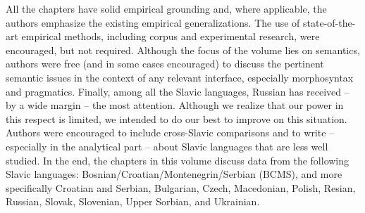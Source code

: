 \documentclass[output=paper,colorlinks,citecolor=brown]{langscibook}
\begin{document}
All the chapters have solid empirical grounding and, where applicable, the authors emphasize the existing empirical generalizations. The use of state-of-the-art empirical methods, including corpus and experimental research, were encouraged, but not required. Although the focus of the volume lies on semantics, authors were free (and in some cases encouraged) to discuss the pertinent semantic issues in the context of any relevant interface, especially morphosyntax and pragmatics. Finally, among all the Slavic languages, Russian has received -- by a wide margin -- the most attention. Although we realize that our power in this respect is limited, we intended to do our best to improve on this situation. Authors were encouraged to include cross-Slavic comparisons and to write -- especially in the analytical part -- about Slavic languages that are less well studied. In the end, the chapters in this volume discuss data from the following Slavic languages: Bosnian/Croatian/Montenegrin/Serbian (BCMS), and more specifically Croatian and Serbian, Bulgarian, Czech, Macedonian, Polish, Resian, Russian, Slovak, Slovenian, Upper Sorbian, and Ukrainian.  %
\end{document}
